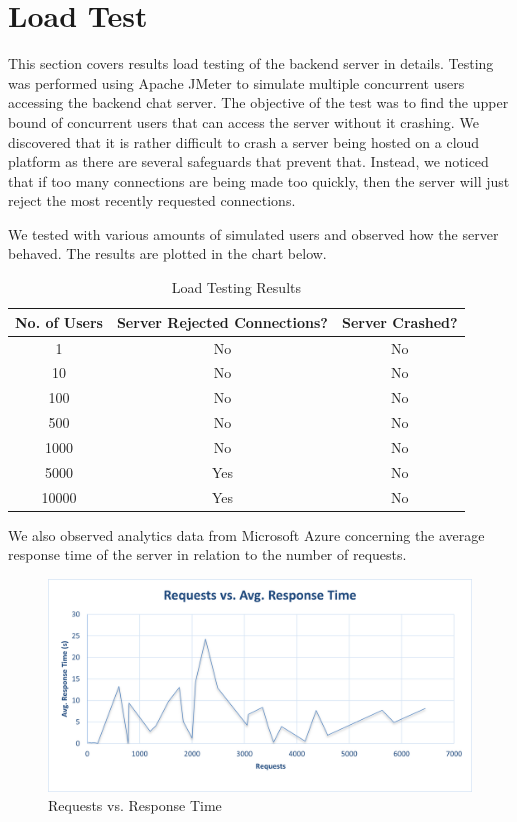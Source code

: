 \documentclass[12pt, titlepage]{article}
\begin{document}
\section{Load Test}\label{load}

This section covers results load testing of the backend server in details.
Testing was performed using Apache JMeter to simulate multiple concurrent users accessing the backend chat server. The objective of the test was to find the upper bound of concurrent users that can access the server without it crashing.
We discovered that it is rather difficult to crash a server being hosted on a cloud platform as there are several safeguards that prevent that.
Instead, we noticed that if too many connections are being made too quickly, then the server will just reject the most recently requested connections.

\newpage

We tested with various amounts of simulated users and observed how the server behaved. The results are plotted in the chart below.

\begin{table}[!htbp]
  \centering
  \begin{tabular}{|c|c|c|}
  \hline
  No. of Users & Server Rejected Connections? & Server Crashed? \\ \hline
  1 & No & No \\ \hline
  10 & No & No \\ \hline
  100 & No & No \\ \hline
  500 & No & No \\ \hline
  1000 & No & No \\ \hline
  5000 & Yes & No \\ \hline
  10000 & Yes & No \\ \hline
  \end{tabular}
  \caption{Load Testing Results}
\end{table}

We also observed analytics data from Microsoft Azure concerning the average response time of the server in relation to the number of requests.

\begin{figure}[!htbp]
  \centering
  \includegraphics[width=\textwidth,keepaspectratio]{chart1.png}
  \caption{Requests vs. Response Time}
\end{figure}
\end{document}
